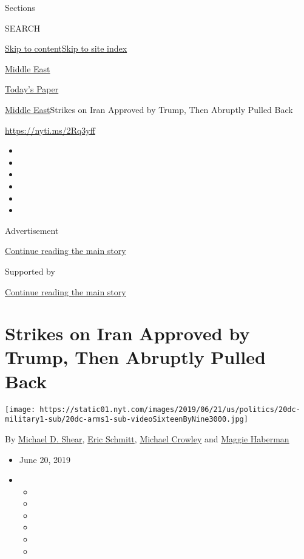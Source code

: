 Sections

SEARCH

\protect\hyperlink{site-content}{Skip to
content}\protect\hyperlink{site-index}{Skip to site index}

\href{https://www.nytimes.com/section/world/middleeast}{Middle East}

\href{https://myaccount.nytimes.com/auth/login?response_type=cookie\&client_id=vi}{}

\href{https://www.nytimes.com/section/todayspaper}{Today's Paper}

\href{/section/world/middleeast}{Middle East}\textbar{}Strikes on Iran
Approved by Trump, Then Abruptly Pulled Back

\url{https://nyti.ms/2Rq3yff}

\begin{itemize}
\item
\item
\item
\item
\item
\item
\end{itemize}

Advertisement

\protect\hyperlink{after-top}{Continue reading the main story}

Supported by

\protect\hyperlink{after-sponsor}{Continue reading the main story}

\hypertarget{strikes-on-iran-approved-by-trump-then-abruptly-pulled-back}{%
\section{Strikes on Iran Approved by Trump, Then Abruptly Pulled
Back}\label{strikes-on-iran-approved-by-trump-then-abruptly-pulled-back}}

\texttt{[image: https://static01.nyt.com/images/2019/06/21/us/politics/20dc-military1-sub/20dc-arms1-sub-videoSixteenByNine3000.jpg]}

By \href{https://www.nytimes.com/by/michael-d-shear}{Michael D. Shear},
\href{https://www.nytimes.com/by/eric-schmitt}{Eric Schmitt},
\href{https://www.nytimes.com/by/michael-crowley}{Michael Crowley} and
\href{https://www.nytimes.com/by/maggie-haberman}{Maggie Haberman}

\begin{itemize}
\item
  June 20, 2019
\item
  \begin{itemize}
  \item
  \item
  \item
  \item
  \item
  \item
  \end{itemize}
\end{itemize}

